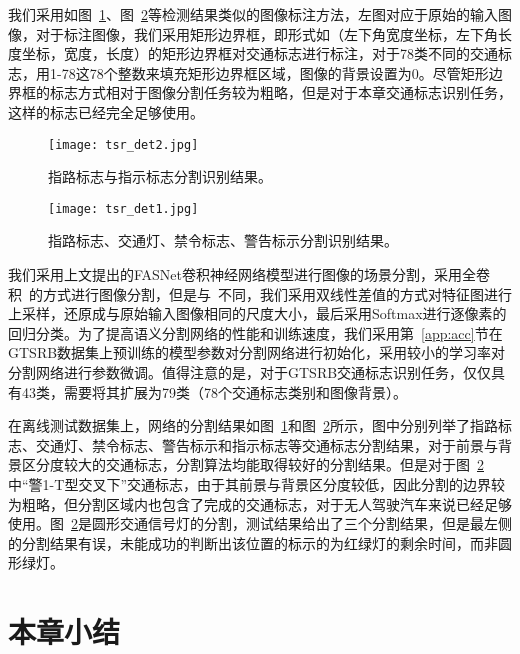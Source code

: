 我们采用如图~\ref{fig:tsr_det2}、图~\ref{fig:tsr_det1}等检测结果类似的图像标注方法，左图对应于原始的输入图像，对于标注图像，我们采用矩形边界框，即形式如（左下角宽度坐标，左下角长度坐标，宽度，长度）的矩形边界框对交通标志进行标注，对于78类不同的交通标志，用1-78这78个整数来填充矩形边界框区域，图像的背景设置为0。尽管矩形边界框的标志方式相对于图像分割任务较为粗略，但是对于本章交通标志识别任务，这样的标志已经完全足够使用。

\begin{figure}
\centering
\texttt{[image: tsr\_det2.jpg]}
\caption{指路标志与指示标志分割识别结果。}
\label{fig:tsr_det2}
\end{figure}

\begin{figure}
\centering
\texttt{[image: tsr\_det1.jpg]}
\caption{指路标志、交通灯、禁令标志、警告标示分割识别结果。}
\label{fig:tsr_det1}
\end{figure}



我们采用上文提出的FASNet卷积神经网络模型进行图像的场景分割，采用全卷积~\cite{long2014fully}的方式进行图像分割，但是与~\cite{long2014fully}不同，我们采用双线性差值的方式对特征图进行上采样，还原成与原始输入图像相同的尺度大小，最后采用Softmax进行逐像素的回归分类。为了提高语义分割网络的性能和训练速度，我们采用第~\ref{app:acc}节在GTSRB数据集上预训练的模型参数对分割网络进行初始化，采用较小的学习率对分割网络进行参数微调。值得注意的是，对于GTSRB交通标志识别任务，仅仅具有43类，需要将其扩展为79类（78个交通标志类别和图像背景）。

在离线测试数据集上，网络的分割结果如图~\ref{fig:tsr_det2}和图~\ref{fig:tsr_det1}所示，图中分别列举了指路标志、交通灯、禁令标志、警告标示和指示标志等交通标志分割结果，对于前景与背景区分度较大的交通标志，分割算法均能取得较好的分割结果。但是对于图~\ref{fig:tsr_det1}中“警1-T型交叉下”交通标志，由于其前景与背景区分度较低，因此分割的边界较为粗略，但分割区域内也包含了完成的交通标志，对于无人驾驶汽车来说已经足够使用。图~\ref{fig:tsr_det1}是圆形交通信号灯的分割，测试结果给出了三个分割结果，但是最左侧的分割结果有误，未能成功的判断出该位置的标示的为红绿灯的剩余时间，而非圆形绿灯。

\section{本章小结}
\label{sec:seg:conclusion}

